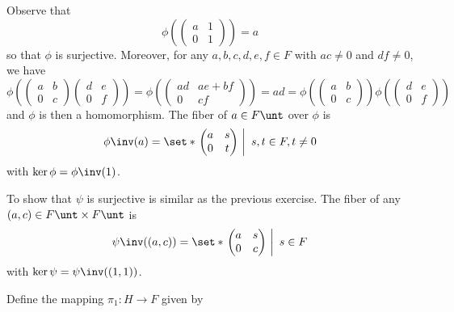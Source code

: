 \begin{solenum}
    \item Observe that
    \[
    	\phi\left(
        \begin{pmatrix}
            a & 1 \\
            0 & 1
        \end{pmatrix}\right) = a
	\]
    so that $\phi$ is surjective.
	Moreover, for any $a, b, c, d, e, f \in F$ with $ac \neq 0$ and $df \neq 0$, we have
    \[
    	\phi\left(
        \begin{pmatrix}
            a & b \\
            0 & c
        \end{pmatrix}
        \begin{pmatrix}
            d & e \\
            0 & f
        \end{pmatrix}\right) = 
        \phi\left(
        \begin{pmatrix}
            ad & ae + bf \\
            0 & cf
        \end{pmatrix}\right) = ad = 
        \phi\left(
        \begin{pmatrix}
            a & b \\
            0 & c
        \end{pmatrix}\right)
        \phi\left(
        \begin{pmatrix}
            d & e \\
            0 & f
        \end{pmatrix}\right)
	\]
    and $\phi$ is then a homomorphism.
	The fiber of $a \in F\unt$ over $\phi$ is
    \[
    	\phi\inv(a) = 
        \set*{\left.
        \begin{pmatrix}
            a & s \\
            0 & t
        \end{pmatrix}~\right|~s, t \in F, t \neq 0}
	\]
    with $\ker\phi = \phi\inv(1)$.
    \item To show that $\psi$ is surjective is similar as the previous exercise.
	The fiber of any $(a, c) \in F\unt \times F\unt$ is
    \[
    	\psi\inv((a, c)) = 
        \set*{\left.
        \begin{pmatrix}
            a & s \\
            0 & c
        \end{pmatrix}~\right|~s \in F}
	\]
    with $\ker\psi = \psi\inv((1, 1))$.
    \item Define the mapping $\pi_1 \colon H \to F$ given by

\end{solenum}
